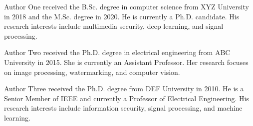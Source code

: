 \documentclass[journal]{IEEEtran}
\begin{document}



\begin{IEEEbiographynophoto}{Author One}
received the B.Sc. degree in computer science from XYZ University in 2018
and the M.Sc. degree in 2020. He is currently a Ph.D. candidate. His
research interests include multimedia security, deep learning, and
signal processing.
\end{IEEEbiographynophoto}

\begin{IEEEbiographynophoto}{Author Two}
received the Ph.D. degree in electrical engineering from ABC University
in 2015. She is currently an Assistant Professor. Her research focuses
on image processing, watermarking, and computer vision.
\end{IEEEbiographynophoto}

\begin{IEEEbiographynophoto}{Author Three}
received the Ph.D. degree from DEF University in 2010. He is a Senior
Member of IEEE and currently a Professor of Electrical Engineering.
His research interests include information security, signal processing,
and machine learning.
\end{IEEEbiographynophoto}
\end{document}
